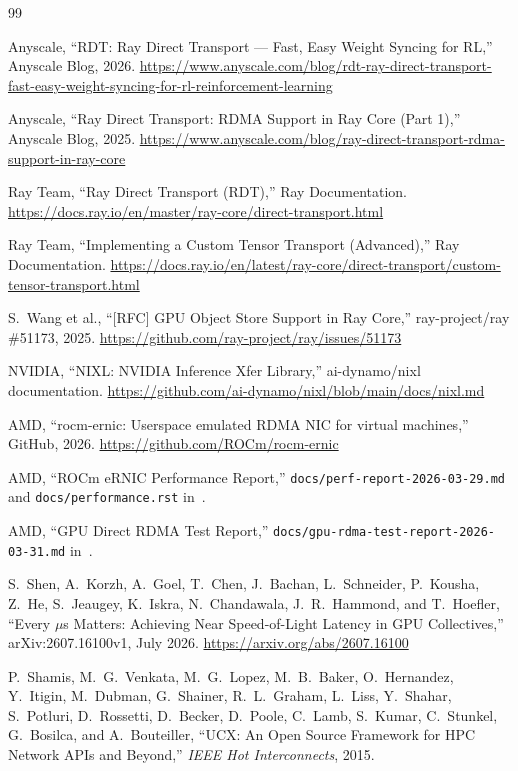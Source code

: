 \documentclass[11pt,letterpaper]{article}
\begin{document}
\begin{thebibliography}{99}\small

Anyscale, ``RDT: Ray Direct Transport --- Fast, Easy Weight Syncing for RL,'' Anyscale Blog, 2026. \url{https://www.anyscale.com/blog/rdt-ray-direct-transport-fast-easy-weight-syncing-for-rl-reinforcement-learning}

Anyscale, ``Ray Direct Transport: RDMA Support in Ray Core (Part 1),'' Anyscale Blog, 2025. \url{https://www.anyscale.com/blog/ray-direct-transport-rdma-support-in-ray-core}

Ray Team, ``Ray Direct Transport (RDT),'' Ray Documentation. \url{https://docs.ray.io/en/master/ray-core/direct-transport.html}

Ray Team, ``Implementing a Custom Tensor Transport (Advanced),'' Ray Documentation. \url{https://docs.ray.io/en/latest/ray-core/direct-transport/custom-tensor-transport.html}

S.~Wang et al., ``[RFC] GPU Object Store Support in Ray Core,'' ray-project/ray \#51173, 2025. \url{https://github.com/ray-project/ray/issues/51173}

NVIDIA, ``NIXL: NVIDIA Inference Xfer Library,'' ai-dynamo/nixl documentation. \url{https://github.com/ai-dynamo/nixl/blob/main/docs/nixl.md}

AMD, ``rocm-ernic: Userspace emulated RDMA NIC for virtual machines,'' GitHub, 2026. \url{https://github.com/ROCm/rocm-ernic}

AMD, ``ROCm eRNIC Performance Report,'' \texttt{docs/perf-report-2026-03-29.md} and \texttt{docs/performance.rst} in~\cite{rocm_ernic}.

AMD, ``GPU Direct RDMA Test Report,'' \texttt{docs/gpu-rdma-test-report-2026-03-31.md} in~\cite{rocm_ernic}.

S.~Shen, A.~Korzh, A.~Goel, T.~Chen, J.~Bachan, L.~Schneider, P.~Kousha, Z.~He, S.~Jeaugey, K.~Iskra, N.~Chandawala, J.~R.~Hammond, and T.~Hoefler, ``Every $\mu$s Matters: Achieving Near Speed-of-Light Latency in GPU Collectives,'' arXiv:2607.16100v1, July 2026. \url{https://arxiv.org/abs/2607.16100}

P.~Shamis, M.~G.~Venkata, M.~G.~Lopez, M.~B.~Baker, O.~Hernandez, Y.~Itigin, M.~Dubman, G.~Shainer, R.~L.~Graham, L.~Liss, Y.~Shahar, S.~Potluri, D.~Rossetti, D.~Becker, D.~Poole, C.~Lamb, S.~Kumar, C.~Stunkel, G.~Bosilca, and A.~Bouteiller, ``UCX: An Open Source Framework for HPC Network APIs and Beyond,'' \emph{IEEE Hot Interconnects}, 2015.


\end{thebibliography}
\end{document}
